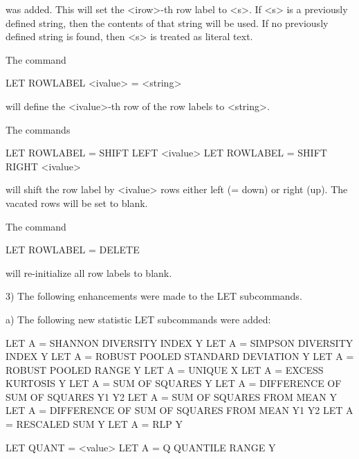 {       was added.  This will set the <irow>-th row label to <s>.
       If <s> is a previously defined string, then the contents
       of that string will be used.  If no previously defined string
       is found, then <s> is treated as literal text.

       The command

           LET ROWLABEL <ivalue> = <string>

       will define the <ivalue>-th row of the row labels to <string>.

       The commands

           LET ROWLABEL = SHIFT LEFT  <ivalue>
           LET ROWLABEL = SHIFT RIGHT <ivalue>

       will shift the row label by <ivalue> rows either left
       (= down) or right (up).  The vacated rows will be set to
       blank.

       The command

           LET ROWLABEL = DELETE

       will re-initialize all row labels to blank.

 3) The following enhancements were made to the LET subcommands.

    a) The following new statistic LET subcommands were added:

          LET A = SHANNON DIVERSITY INDEX Y
          LET A = SIMPSON DIVERSITY INDEX Y
          LET A = ROBUST POOLED STANDARD DEVIATION Y
          LET A = ROBUST POOLED RANGE Y
          LET A = UNIQUE X
          LET A = EXCESS KURTOSIS Y
          LET A = SUM OF SQUARES Y
          LET A = DIFFERENCE OF SUM OF SQUARES Y1 Y2
          LET A = SUM OF SQUARES FROM MEAN Y
          LET A = DIFFERENCE OF SUM OF SQUARES FROM MEAN Y1 Y2
          LET A = RESCALED SUM Y
          LET A = RLP Y

          LET QUANT = <value>
          LET A = Q QUANTILE RANGE Y

}
